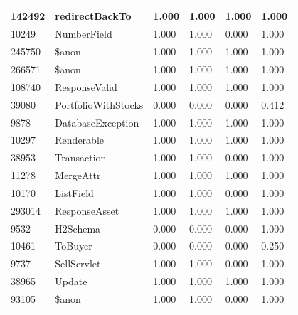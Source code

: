 \documentclass[a4paper]{article}
\newlength{\DUtablewidth} %
\begin{document}
\begin{longtable*}[c]{|p{0.160\DUtablewidth}|p{0.160\DUtablewidth}|p{0.160\DUtablewidth}|p{0.160\DUtablewidth}|p{0.160\DUtablewidth}|p{0.160\DUtablewidth}|}
142492
 & 
redirectBackTo
 & 
1.000
 & 
1.000
 & 
1.000
 & 
1.000
 \\
\hline

10249
 & 
NumberField
 & 
1.000
 & 
1.000
 & 
0.000
 & 
1.000
 \\
\hline

245750
 & 
\$anon
 & 
1.000
 & 
1.000
 & 
1.000
 & 
1.000
 \\
\hline

266571
 & 
\$anon
 & 
1.000
 & 
1.000
 & 
1.000
 & 
1.000
 \\
\hline

108740
 & 
ResponseValid
 & 
1.000
 & 
1.000
 & 
1.000
 & 
1.000
 \\
\hline

39080
 & 
PortfolioWithStocks
 & 
0.000
 & 
0.000
 & 
0.000
 & 
0.412
 \\
\hline

9878
 & 
DatabaseException
 & 
1.000
 & 
1.000
 & 
1.000
 & 
1.000
 \\
\hline

10297
 & 
Renderable
 & 
1.000
 & 
1.000
 & 
1.000
 & 
1.000
 \\
\hline

38953
 & 
Transaction
 & 
1.000
 & 
1.000
 & 
0.000
 & 
1.000
 \\
\hline

11278
 & 
MergeAttr
 & 
1.000
 & 
1.000
 & 
1.000
 & 
1.000
 \\
\hline

10170
 & 
ListField
 & 
1.000
 & 
1.000
 & 
0.000
 & 
1.000
 \\
\hline

293014
 & 
ResponseAsset
 & 
1.000
 & 
1.000
 & 
1.000
 & 
1.000
 \\
\hline

9532
 & 
H2Schema
 & 
0.000
 & 
0.000
 & 
0.000
 & 
1.000
 \\
\hline

10461
 & 
ToBuyer
 & 
0.000
 & 
0.000
 & 
0.000
 & 
0.250
 \\
\hline

9737
 & 
SellServlet
 & 
1.000
 & 
1.000
 & 
0.000
 & 
1.000
 \\
\hline

38965
 & 
Update
 & 
1.000
 & 
1.000
 & 
1.000
 & 
1.000
 \\
\hline

93105
 & 
\$anon
 & 
1.000
 & 
1.000
 & 
0.000
 & 
1.000
 \\
\hline


\end{longtable*}
\end{document}
